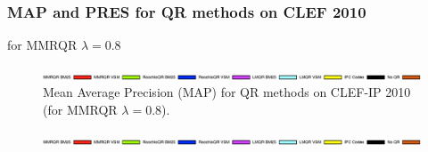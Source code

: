 \documentclass[xcolor=x11names,compress]{beamer}
\renewcommand{\(}{\begin{columns}}
\renewcommand{\)}{\end{columns}}
\newcommand{\<}[1]{\begin{column}{#1}}
\renewcommand{\>}{\end{column}}
\begin{document}
\begin{frame}
\frametitle{MAP and PRES for QR methods on CLEF 2010}

for MMRQR $\lambda=0.8$

\begin{figure}
\begin{centering}
\includegraphics[width=15.5cm]{../img/legendQR}
\par\end{centering}

\begin{centering}
\par\end{centering}

\caption{Mean Average Precision (MAP) for QR methods on CLEF-IP 2010 (for MMRQR
$\lambda=0.8$).}


\label{fig:QR-PRES-CLEF-IP2010}
\end{figure}


\begin{figure}
\begin{centering}
\includegraphics[width=15.5cm]{../img/legendQR}
\par\end{centering}


\end{figure}
\end{frame}
\end{document}
